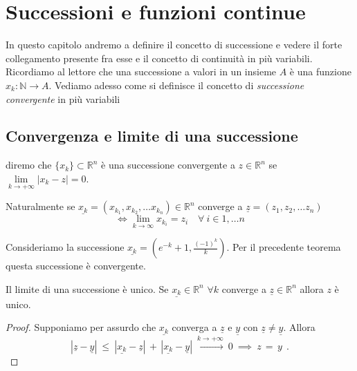 \chapter{Successioni e funzioni continue}
	\pagestyle{plain}
	\thispagestyle{empty}
	\pagestyle{fancy}
In questo capitolo andremo a definire il concetto di successione e vedere il forte collegamento presente fra esse e il concetto di continuità in più variabili. \\
Ricordiamo al lettore che una successione a valori in un insieme $A$ è una funzione $x_k: \mathbb{N} \to A$. Vediamo adesso come si definisce il concetto di \emph{successione convergente} in più variabili

%
%
%
\vspace{0.5cm}
\section{Convergenza e limite di una successione}

\begin{definition}[\textcolor{blue}{convergenza di una successione}]
diremo che $\{x_k \} \subset \mathbb{R}^n$ è una successione convergente a $z \in \mathbb{R}^n$ se $\lim\limits_{k \to +\infty} |x_k - z| = 0$.
\end{definition}

\begin{remark}
Naturalmente se $\underline{x_k} = (x_{k_1}, x_{k_2}, \ldots x_{k_n}) \in \mathbb{R}^n$ converge a $\underline{z} = (z_1, z_2, \ldots z_n)$ 
\[\iff \lim\limits_{k \to \infty} x_{k_i} = z_i \quad \forall\ i \in 1, \ldots n\]
\end{remark}

\begin{example}
Consideriamo la successione $\underline{x_k} = (e^{-k} + 1,\frac{(-1)^k}{k})$. Per il precedente teorema questa successione è convergente.
\end{example}

%
\vspace{0.5cm}
\begin{prop}[\textcolor{blue}{Unicità del limite}]
Il limite di una successione è unico. 
Se $\underline{x_k} \in \mathbb{R}^n \, \, \forall k$ converge a $\underline{z} \in \mathbb{R}^n$ allora $z$ è unico.
\end{prop}

\begin{proof}
Supponiamo per assurdo che $\underline{x_k}$ converga a $\underline{z}$ e $\underline{y}$ con $\underline{z} \neq \underline{y}$. Allora
$$
|\underline{z} - \underline{y}|\ \leq\ |\underline{x_k} - \underline{z}|\, +\, |\underline{x_k} - \underline{y}|\ \stackrel{k \to +\infty}{\to}\ 0\ \implies \ z\, =\, y\ \ .
$$
\end{proof}

